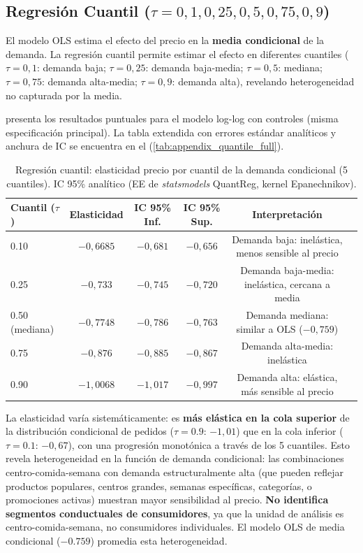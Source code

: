 \documentclass[doc, a4paper, biblatex, floatsintext, longtable, babel]{apa7}
\begin{document}
\subsection{Regresión Cuantil ($\tau=0,1, 0,25, 0,5, 0,75, 0,9$)}
\label{subsec:quantile_regression}

El modelo OLS estima el efecto del precio en la \textbf{media condicional} de la demanda. La regresión cuantil permite estimar el efecto en diferentes cuantiles ($\tau=0,1$: demanda baja; $\tau=0,25$: demanda baja-media; $\tau=0,5$: mediana; $\tau=0,75$: demanda alta-media; $\tau=0,9$: demanda alta), revelando heterogeneidad no capturada por la media.

 presenta los resultados puntuales para el modelo log-log con controles (misma especificación principal). La tabla extendida con errores estándar analíticos y anchura de IC se encuentra en el  (\cref{tab:appendix_quantile_full}).

\begin{table}[!htbp]
\centering
\caption{Regresión cuantil: elasticidad precio por cuantil de la demanda condicional (5 cuantiles). IC 95\% analítico (EE de \textit{statsmodels} QuantReg, kernel Epanechnikov).}
\label{tab:quantile_regression}
\footnotesize
\setlength{\tabcolsep}{3pt}
\begin{tabular}{@{}lccccp{3.2cm}@{}}
\toprule
Cuantil ($\tau$) & Elasticidad & IC 95\% Inf. & IC 95\% Sup. & Interpretación \\
\midrule
0.10 & $-0,6685$ & $-0,681$ & $-0,656$ & Demanda baja: inelástica, menos sensible al precio \\
0.25 & $-0,733$ & $-0,745$ & $-0,720$ & Demanda baja-media: inelástica, cercana a media \\
0.50 (mediana) & $-0,7748$ & $-0,786$ & $-0,763$ & Demanda mediana: similar a OLS ($-0,759$) \\
0.75 & $-0,876$ & $-0,885$ & $-0,867$ & Demanda alta-media: inelástica \\
0.90 & $-1,0068$ & $-1,017$ & $-0,997$ & Demanda alta: elástica, más sensible al precio \\
\bottomrule
\end{tabular}
\end{table}

La elasticidad varía sistemáticamente: es \textbf{más elástica en la cola superior} de la distribución condicional de pedidos ($\tau=0.9$: $-1,01$) que en la cola inferior ($\tau=0.1$: $-0,67$), con una progresión monotónica a través de los 5 cuantiles. Esto revela heterogeneidad en la función de demanda condicional: las combinaciones centro-comida-semana con demanda estructuralmente alta (que pueden reflejar productos populares, centros grandes, semanas específicas, categorías, o promociones activas) muestran mayor sensibilidad al precio. \textbf{No identifica segmentos conductuales de consumidores}, ya que la unidad de análisis es centro-comida-semana, no consumidores individuales. El modelo OLS de media condicional ($-0.759$) promedia esta heterogeneidad.
\end{document}
